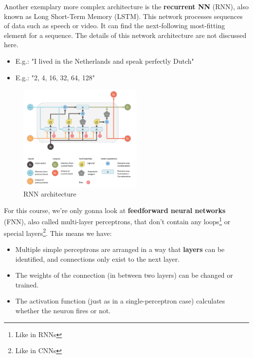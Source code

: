 Another exemplary more complex architecture is the \textbf{recurrent NN} (RNN), also known as Long Short-Term Memory (LSTM). This network processes sequences of data such as speech or video. It can find the next-following most-fitting element for a sequence. The details of this network architecture are not discussed here.
\begin{note}\begin{itemize}
  \item E.g.: "I lived in the Netherlands and speak perfectly \textcolor{burntorange}{Dutch}"
  \item E.g.: "2, 4, 16, 32, 64, \textcolor{burntorange}{128}"
\end{itemize}\end{note}

\begin{figure}[H]
  \centering
  \includegraphics[width=0.55\textwidth]{assets/nn/fnn__rnn.png}
  \caption{RNN architecture}
  \label{fig:6_fnn_rnn}
\end{figure}

For this course, we're only gonna look at \textbf{feedforward neural networks} (FNN), also called multi-layer perceptrons, that don't contain any loops\footnote{Like in RNNs} or special layers\footnote{Like in CNNs}. This means we have:
\begin{itemize}
  \item Multiple simple perceptrons are arranged in a way that \textbf{layers} can be identified, and connections only exist to the next layer.
  \item The weights of the connection (in between two layers) can be changed or trained.
  \item The activation function (just as in a single-perceptron case) calculates whether the neuron fires or not.
\end{itemize}


